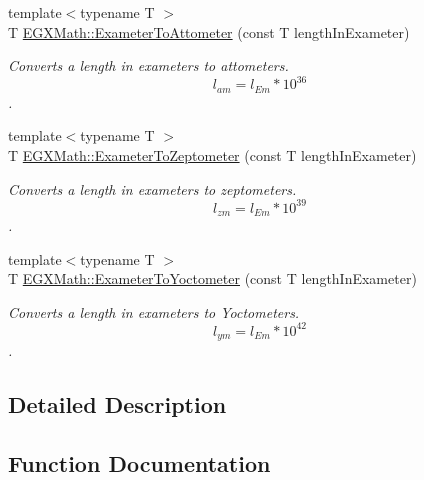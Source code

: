 \begin{DoxyCompactItemize}
{\footnotesize template$<$typename T $>$ }\\T \mbox{\hyperlink{group___e_g_x_math-_conversions-_length_conversions-_exameter-_s_i_ga9218bf3c4bf645d50a26dda886a81765}{E\+G\+X\+Math\+::\+Exameter\+To\+Attometer}} (const T length\+In\+Exameter)
\begin{DoxyCompactList}\small\item\em Converts a length in exameters to attometers. \[ l_{am}=l_{Em} * 10^{36} \]. \end{DoxyCompactList}\item 
{\footnotesize template$<$typename T $>$ }\\T \mbox{\hyperlink{group___e_g_x_math-_conversions-_length_conversions-_exameter-_s_i_ga5c4c4016d9d88622b4f3c5c071779025}{E\+G\+X\+Math\+::\+Exameter\+To\+Zeptometer}} (const T length\+In\+Exameter)
\begin{DoxyCompactList}\small\item\em Converts a length in exameters to zeptometers. \[ l_{zm}=l_{Em} * 10^{39} \]. \end{DoxyCompactList}\item 
{\footnotesize template$<$typename T $>$ }\\T \mbox{\hyperlink{group___e_g_x_math-_conversions-_length_conversions-_exameter-_s_i_ga0da838a3aa4a2f6ee53687aa346f80ef}{E\+G\+X\+Math\+::\+Exameter\+To\+Yoctometer}} (const T length\+In\+Exameter)
\begin{DoxyCompactList}\small\item\em Converts a length in exameters to Yoctometers. \[ l_{ym}=l_{Em} * 10^{42} \]. \end{DoxyCompactList}\end{DoxyCompactItemize}


\subsection{Detailed Description}


\subsection{Function Documentation}
\mbox{\label{group___e_g_x_math-_conversions-_length_conversions-_exameter-_s_i_ga9218bf3c4bf645d50a26dda886a81765}} 
